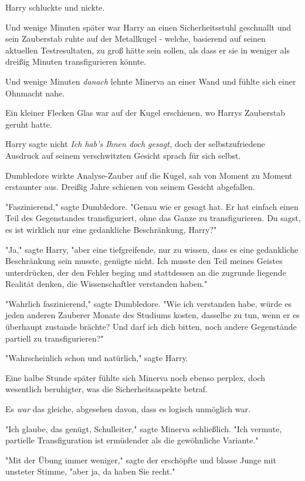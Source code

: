 {Harry schluckte und nickte.

Und wenige Minuten später war Harry an einen Sicherheitsstuhl geschnallt und sein Zauberstab ruhte auf der Metallkugel - welche, basierend auf seinen aktuellen Testresultaten, zu groß hätte sein sollen, als dass er sie in weniger als dreißig Minuten transfigurieren könnte.

Und wenige Minuten \emph{danach} lehnte Minerva an einer Wand und fühlte sich einer Ohnmacht nahe.

Ein kleiner Flecken Glas war auf der Kugel erschienen, wo Harrys Zauberstab geruht hatte.

Harry sagte nicht \emph{Ich hab's Ihnen doch gesagt,} doch der selbstzufriedene Ausdruck auf seinem verschwitzten Gesicht sprach für sich selbst.

Dumbledore wirkte Analyse-Zauber auf die Kugel, sah von Moment zu Moment erstaunter aus. Dreißig Jahre schienen von seinem Gesicht abgefallen.

"Faszinierend," sagte Dumbledore. "Genau wie er gesagt hat. Er hat einfach einen Teil des Gegenstandes transfiguriert, ohne das Ganze zu transfigurieren. Du sagst, es ist wirklich nur eine gedankliche Beschränkung, Harry?"

"Ja," sagte Harry, "aber eine tiefgreifende, nur zu wissen, dass es eine gedankliche Beschränkung sein musste, genügte nicht. Ich musste den Teil meines Geistes unterdrücken, der den Fehler beging und stattdessen an die zugrunde liegende Realität denken, die Wissenschaftler verstanden haben."

"Wahrlich faszinierend," sagte Dumbledore. "Wie ich verstanden habe, würde es jeden anderen Zauberer Monate des Studiums kosten, dasselbe zu tun, wenn er es überhaupt zustande brächte? Und darf ich dich bitten, noch andere Gegenstände partiell zu transfigurieren?"

"Wahrscheinlich schon und natürlich," sagte Harry.

Eine halbe Stunde später fühlte sich Minerva noch ebenso perplex, doch wesentlich beruhigter, was die Sicherheitsaspekte betraf.

Es \emph{war} das gleiche, abgesehen davon, dass es logisch unmöglich war.

"Ich glaube, das genügt, Schulleiter," sagte Minerva schließlich. "Ich vermute, partielle Transfiguration ist ermüdender als die gewöhnliche Variante."

"Mit der Übung immer weniger," sagte der erschöpfte und blasse Junge mit unsteter Stimme, "aber ja, da haben Sie recht."

}
